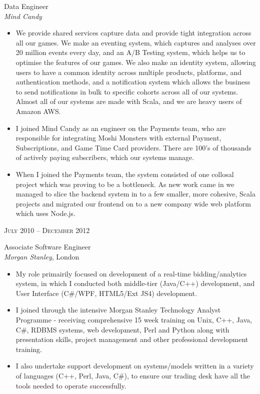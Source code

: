 \documentclass[10pt]{article} %
\begin{document}
{\begin{minipage}[t]{0.5\textwidth}
{\raggedright\large Data Engineer\\
\textit{Mind Candy}\\[5pt]}

\normalsize{
\begin{itemize}
\item We provide shared services capture data and provide tight integration across all our games. We make an eventing system, which captures and analyses over 20 million events every day, and an A/B Testing system, which helps us to optimise the features of our games. We also make an identity system, allowing users to have a common identity across multiple products, platforms, and authentication methods, and a notification system which allows the business to send notifications in bulk to specific cohorts across all of our systems. Almost all of our systems are made with Scala, and we are heavy users of Amazon AWS.
\item I joined Mind Candy as an engineer on the Payments team, who are responsible for integrating Moshi Monsters with external Payment, Subscriptions, and Game Time Card providers. There are 100's of thousands of actively paying subscribers, which our systems manage.
\item When I joined the Payments team, the system consisted of one collosal project which was proving to be a bottleneck. As new work came in we managed to slice the backend system in to a few smaller, more cohesive, Scala projects and migrated our frontend on to a new company wide web platform which uses Node.js.
\end{itemize}}


{\raggedleft\textsc{July 2010 -- December 2012}\par}

{\raggedright\large Associate Software Engineer\\
\textit{Morgan Stanley}, London\\[5pt]}

\normalsize{
\begin{itemize}
	\item My role primairily focused on development of a real-time bidding/analytics system, in which I conducted both middle-tier (Java/C++) development, and User Interface (C\#/WPF, HTML5/Ext JS4) development.
	\item I joined through the intensive Morgan Stanley Technology Analyst Programme - receiving comprehensive 15 week training on Unix, C++, Java, C\#, RDBMS systems, web development, Perl and Python along with presentation skills, project management and other professional development training.
	\item I also undertake support development on systems/models written in a variety of languages (C++, Perl, Java, C\#), to ensure our trading desk have all the tools needed to operate successfully.
\end{itemize}}


\end{minipage}}
\end{document}

